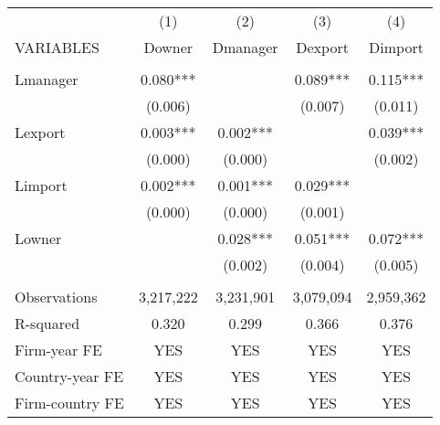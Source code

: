 \begin{tabular}{lcccc} \hline
 & (1) & (2) & (3) & (4) \\
VARIABLES & Downer & Dmanager & Dexport & Dimport \\ \hline
 &  &  &  &  \\
Lmanager & 0.080*** &  & 0.089*** & 0.115*** \\
 & (0.006) &  & (0.007) & (0.011) \\
Lexport & 0.003*** & 0.002*** &  & 0.039*** \\
 & (0.000) & (0.000) &  & (0.002) \\
Limport & 0.002*** & 0.001*** & 0.029*** &  \\
 & (0.000) & (0.000) & (0.001) &  \\
Lowner &  & 0.028*** & 0.051*** & 0.072*** \\
 &  & (0.002) & (0.004) & (0.005) \\
 &  &  &  &  \\
Observations & 3,217,222 & 3,231,901 & 3,079,094 & 2,959,362 \\
R-squared & 0.320 & 0.299 & 0.366 & 0.376 \\
Firm-year FE & YES & YES & YES & YES \\
Country-year FE & YES & YES & YES & YES \\
 Firm-country FE & YES & YES & YES & YES \\ \hline
\end{tabular}
